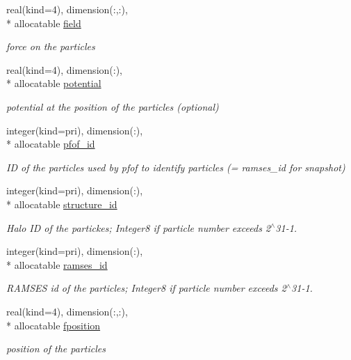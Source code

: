 \begin{DoxyCompactItemize}
real(kind=4), dimension(\-:,\-:), \\*
allocatable \hyperlink{classmodvarcommons_af5bba78d6e056541f1defb808bf62d63}{field}
\begin{DoxyCompactList}\small\item\em force on the particles \end{DoxyCompactList}\item 
real(kind=4), dimension(\-:), \\*
allocatable \hyperlink{classmodvarcommons_a2c88b0f5e49a7236083aefd81aa33877}{potential}
\begin{DoxyCompactList}\small\item\em potential at the position of the particles (optional) \end{DoxyCompactList}\item 
integer(kind=pri), dimension(\-:), \\*
allocatable \hyperlink{classmodvarcommons_ac41f2f8ba4836f86de4c566f01b7f4c9}{pfof\-\_\-id}
\begin{DoxyCompactList}\small\item\em I\-D of the particles used by pfof to identify particles (= ramses\-\_\-id for snapshot) \end{DoxyCompactList}\item 
integer(kind=pri), dimension(\-:), \\*
allocatable \hyperlink{classmodvarcommons_aa00fdd8871a32c56cc03a4b25e272346}{structure\-\_\-id}
\begin{DoxyCompactList}\small\item\em Halo I\-D of the partickes; Integer8 if particle number exceeds 2$^\wedge$31-\/1. \end{DoxyCompactList}\item 
integer(kind=pri), dimension(\-:), \\*
allocatable \hyperlink{classmodvarcommons_acd431fedb7c6f3075a86103784aba97f}{ramses\-\_\-id}
\begin{DoxyCompactList}\small\item\em R\-A\-M\-S\-E\-S id of the particles; Integer8 if particle number exceeds 2$^\wedge$31-\/1. \end{DoxyCompactList}\item 
real(kind=4), dimension(\-:,\-:), \\*
allocatable \hyperlink{classmodvarcommons_ac0351b89e73074a6621ceef3a7f64e65}{fposition}
\begin{DoxyCompactList}\small\item\em position of the particles \end{DoxyCompactList}\item 

\end{DoxyCompactItemize}
